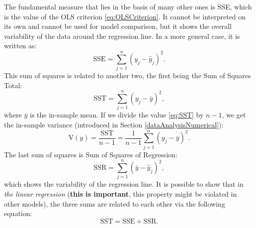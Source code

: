 \documentclass[
]{book}
\theoremstyle{definition}
\theoremstyle{definition}
\theoremstyle{definition}
\theoremstyle{definition}
\theoremstyle{remark}
\begin{document}
The fundamental measure that lies in the basis of many other ones is SSE, which is the value of the OLS criterion \eqref{eq:OLSCriterion}. It cannot be interpreted on its own and cannot be used for model comparison, but it shows the overall variability of the data around the regression line. In a more general case, it is written as:
\begin{equation}
    \mathrm{SSE} = \sum_{j=1}^n (y_j - \hat{y}_j)^2 .
    \label{eq:SSE}
\end{equation}
This sum of squares is related to another two, the first being the Sum of Squares Total:
\begin{equation}
    \mathrm{SST}=\sum_{j=1}^n (y_j - \bar{y})^2,
    \label{eq:SST}
\end{equation}
where \(\bar{y}\) is the in-sample mean. If we divide the value \eqref{eq:SST} by \(n-1\), we get the in-sample variance (introduced in Section \ref{dataAnalysisNumerical}):
\begin{equation*}
    \mathrm{V}(y)=\frac{\mathrm{SST}}{n-1}=\frac{1}{n-1} \sum_{j=1}^n (y_j - \bar{y})^2 .
\end{equation*}
The last sum of squares is Sum of Squares of Regression:
\begin{equation}
    \mathrm{SSR} = \sum_{j=1}^n (\bar{y} - \hat{y}_j)^2 ,
    \label{eq:SSR}
\end{equation}
which shows the variability of the regression line. It is possible to show that in \emph{the linear regression} (\textbf{this is important}, this property might be violated in other models), the three sums are related to each other via the following equation:
\begin{equation}
    \mathrm{SST} = \mathrm{SSE} + \mathrm{SSR} .
    \label{eq:SSTSum}
\end{equation}
\end{document}
